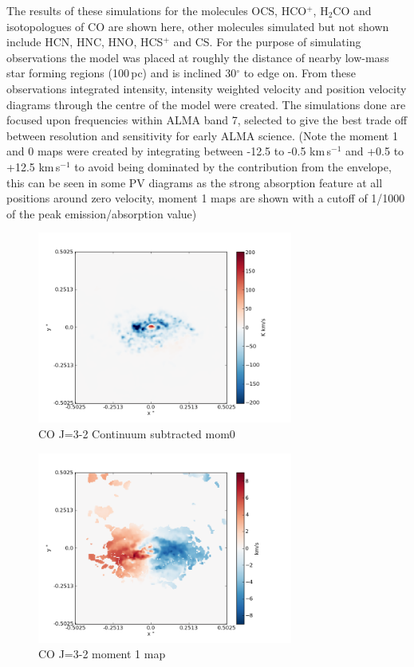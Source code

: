 \documentclass[useAMS,usenatbib]{mn2e}
\begin{document}
The results of these simulations for the molecules OCS, HCO$^+$, H$_2$CO and isotopologues of CO are shown here, other molecules simulated but not shown include HCN, HNC, HNO, HCS$^+$ and  CS.
For the purpose of simulating observations the model was placed at roughly the distance of nearby low-mass star forming regions (100$\,$pc) and is inclined 30$^\circ$ to edge on. From these observations integrated intensity, intensity weighted velocity and position velocity diagrams through the centre of the model were created.
The simulations done are focused upon frequencies within ALMA band 7, selected to give the best trade off between resolution and sensitivity for early ALMA science.
(Note the moment 1 and 0 maps were created by integrating between -12.5 to -0.5 km$\,$s$^{-1}$ and +0.5 to +12.5 km$\,$s$^{-1}$ to avoid being dominated by the contribution from the envelope, this can be seen in some PV diagrams as the strong absorption feature at all positions around zero velocity, moment 1 maps are shown with a cutoff of 1/1000 of the peak emission/absorption value)\newline

\begin{figure}[H]
 \includegraphics[width=84mm]{Figures/sim/imageCO_3-2_30deg_contSub.png}

 \caption{CO J=3-2 Continuum subtracted mom0}
\end{figure}

\begin{figure}[H]
 \includegraphics[width=84mm]{Figures/sim/imageCO_3-2_30deg_mom1.png}

 \caption{CO J=3-2 moment 1 map}
\end{figure}
\end{document}
